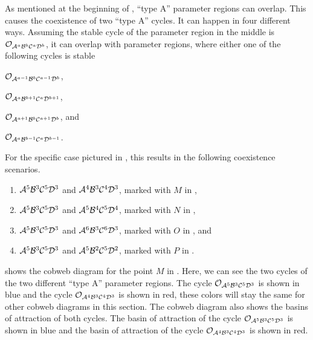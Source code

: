 As mentioned at the beginning of , ``type A'' parameter regions can overlap.
This causes the coexistence of two ``type A'' cycles.
It can happen in four different ways.
Assuming the stable cycle of the parameter region in the middle is $\mathcal{O}_{\mathcal{A}^a\mathcal{B}^b\mathcal{C}^a\mathcal{D}^b}$, it can overlap with parameter regions, where either one of the following cycles is stable
\begin{enumerate*}
	\item $\mathcal{O}_{\mathcal{A}^{a-1}\mathcal{B}^b\mathcal{C}^{a-1}\mathcal{D}^b}$,
	\item $\mathcal{O}_{\mathcal{A}^a\mathcal{B}^{b+1}\mathcal{C}^a\mathcal{D}^{b+1}}$,
	\item $\mathcal{O}_{\mathcal{A}^{a+1}\mathcal{B}^b\mathcal{C}^{a+1}\mathcal{D}^b}$, and
	\item $\mathcal{O}_{\mathcal{A}^a\mathcal{B}^{b-1}\mathcal{C}^a\mathcal{D}^{b-1}}$.
\end{enumerate*}
For the specific case pictured in , this results in the following coexistence scenarios.
\begin{enumerate}
	\item $\mathcal{A}^5\mathcal{B}^3\mathcal{C}^5\mathcal{D}^3$ and $\mathcal{A}^4\mathcal{B}^3\mathcal{C}^4\mathcal{D}^3$, marked with $M$ in ,
	\item $\mathcal{A}^5\mathcal{B}^3\mathcal{C}^5\mathcal{D}^3$ and $\mathcal{A}^5\mathcal{B}^4\mathcal{C}^5\mathcal{D}^4$, marked with $N$ in ,
	\item $\mathcal{A}^5\mathcal{B}^3\mathcal{C}^5\mathcal{D}^3$ and $\mathcal{A}^6\mathcal{B}^3\mathcal{C}^6\mathcal{D}^3$, marked with $O$ in , and
	\item $\mathcal{A}^5\mathcal{B}^3\mathcal{C}^5\mathcal{D}^3$ and $\mathcal{A}^5\mathcal{B}^2\mathcal{C}^5\mathcal{D}^2$, marked with $P$ in .
\end{enumerate}
 shows the cobweb diagram for the point $M$ in .
Here, we can see the two cycles of the two different ``type A'' parameter regions.
The cycle $\mathcal{O}_{\mathcal{A}^5\mathcal{B}^3\mathcal{C}^5\mathcal{D}^3}$ is shown in blue and the cycle $\mathcal{O}_{\mathcal{A}^4\mathcal{B}^3\mathcal{C}^4\mathcal{D}^3}$ is shown in red, these colors will stay the same for other cobweb diagrams in this section.
The cobweb diagram also shows the basins of attraction of both cycles.
The basin of attraction of the cycle $\mathcal{O}_{\mathcal{A}^5\mathcal{B}^3\mathcal{C}^5\mathcal{D}^3}$ is shown in blue and the basin of attraction of the cycle $\mathcal{O}_{\mathcal{A}^4\mathcal{B}^3\mathcal{C}^4\mathcal{D}^3}$ is shown in red.

